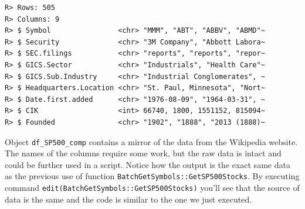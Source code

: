 \documentclass[
  12pt,
]{book}
\newenvironment{Shaded}{\begin{snugshade}}{\end{snugshade}}
\newcommand{\CommentTok}[1]{\textcolor[rgb]{0.37,0.37,0.37}{\textit{#1}}}
\newcommand{\DataTypeTok}[1]{\textcolor[rgb]{0.27,0.27,0.27}{#1}}
\newcommand{\DecValTok}[1]{\textcolor[rgb]{0.06,0.06,0.06}{#1}}
\newcommand{\KeywordTok}[1]{\textcolor[rgb]{0.27,0.27,0.27}{\textbf{#1}}}
\newcommand{\NormalTok}[1]{#1}
\newcommand{\StringTok}[1]{\textcolor[rgb]{0.5,0.5,0.5}{#1}}
\begin{document}
\begin{Shaded}
\end{Shaded}

\begin{verbatim}
R> Rows: 505
R> Columns: 9
R> $ Symbol                <chr> "MMM", "ABT", "ABBV", "ABMD"~
R> $ Security              <chr> "3M Company", "Abbott Labora~
R> $ SEC.filings           <chr> "reports", "reports", "repor~
R> $ GICS.Sector           <chr> "Industrials", "Health Care"~
R> $ GICS.Sub.Industry     <chr> "Industrial Conglomerates", ~
R> $ Headquarters.Location <chr> "St. Paul, Minnesota", "Nort~
R> $ Date.first.added      <chr> "1976-08-09", "1964-03-31", ~
R> $ CIK                   <int> 66740, 1800, 1551152, 815094~
R> $ Founded               <chr> "1902", "1888", "2013 (1888)~
\end{verbatim}

Object \texttt{df\_SP500\_comp} contains a mirror of the data from the Wikipedia website. The names of the columns require some work, but the raw data is intact and could be further used in a script. Notice how the output is the exact same data as the previous use of function \texttt{BatchGetSymbols::GetSP500Stocks}. By executing command \texttt{edit(BatchGetSymbols::GetSP500Stocks)} you'll see that the source of data is the same and the code is similar to the one we just executed.
\end{document}
